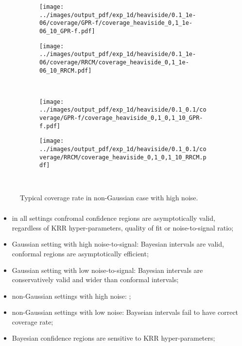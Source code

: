 \documentclass[t]{beamer}  %
\begin{document}
\begin{frame}[t]\frametitle{\insertsection}
  \begin{figure}%
    \centering
    \begin{subfigure}[b]{0.25\linewidth}
      \texttt{[image: ../images/output\_pdf/exp\_1d/heaviside/0.1\_1e-06/coverage/GPR-f/coverage\_heaviside\_0,1\_1e-06\_10\_GPR-f.pdf]}
    \end{subfigure}%
    \begin{subfigure}[b]{0.25\linewidth}
      \texttt{[image: ../images/output\_pdf/exp\_1d/heaviside/0.1\_1e-06/coverage/RRCM/coverage\_heaviside\_0,1\_1e-06\_10\_RRCM.pdf]}
    \end{subfigure}\\
    \begin{subfigure}[b]{0.25\linewidth}
      \texttt{[image: ../images/output\_pdf/exp\_1d/heaviside/0.1\_0.1/coverage/GPR-f/coverage\_heaviside\_0,1\_0,1\_10\_GPR-f.pdf]}
    \end{subfigure}%
    \begin{subfigure}[b]{0.25\linewidth}
      \texttt{[image: ../images/output\_pdf/exp\_1d/heaviside/0.1\_0.1/coverage/RRCM/coverage\_heaviside\_0,1\_0,1\_10\_RRCM.pdf]}
    \end{subfigure}\\
    \caption{Typical coverage rate in non-Gaussian case with high noise.}
    \label{fig:heaviside_1d_high_noise_arb}
  \end{figure}
\end{frame}

\begin{frame}[c]\frametitle{\insertsection}
  \framesubtitle{\insertsubsection}
  \begin{itemize}
    \item in all settings confromal confidence regions are asymptotically valid,
    regardless of KRR hyper-parameters, quality of fit or noise-to-signal ratio;
    \item Gaussian setting with high noise-to-signal: Bayesian intervals are valid,
    conformal regions are asymptotically efficient;
    \item Gaussian setting with low noise-to-signal: Bayesian intervals are
    conservatively valid and wider than conformal intervals;
    \item non-Gaussian settings with high noise: ;
    \item non-Gaussian settings with low noise: Bayseian intervals fail to have
    correct coverage rate;
    \item Bayesian confidence regions are sensitive to KRR hyper-parameters;
  \end{itemize}
\end{frame}
\end{document}
